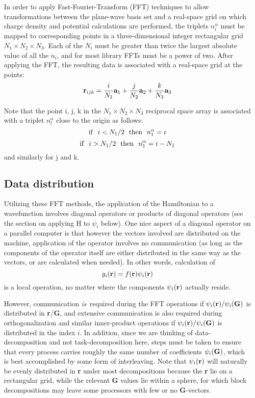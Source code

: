 In order to apply Fast-Fourier-Transform (FFT) techniques to allow
transformations between the plane-wave basis set and a real-space grid on
which charge density and potential calculations are performed,
the triplets $n^{\alpha}_i$ must be mapped to corresponding points in
a three-dimensional integer rectangular grid $N_1 \times N_2 \times N_3$.
Each of the $N_i$ must be greater than twice the largest absolute value
of all the $n_i$, and for most library FFTs must be a power of two. After
applying the FFT, the resulting data is associated with a real-space grid
at the points:
\begin{equation}
{\bf r}_{ijk} = {i \over N_1} {\bf a}_1 + {j \over N_2} {\bf a}_2 +
		{k \over N_3} {\bf a}_3
\end{equation}

Note that the point i, j, k in the $N_1 \times N_2 \times N_3$ reciprocal
space array is associated with a triplet $n^{\alpha}_l$ close to the
origin as follows:
\begin{equation}
{\rm if\ \ } i < N_1/2 {\rm\ \  then\ \ } n^{\alpha}_1 = i
\end{equation}
\begin{equation}
{\rm if\ \ } i > N_1/2 {\rm\ \  then\ \ } n^{\alpha}_1 = i - N_1
\end{equation}
and similarly for j and k.


\subsection{Data distribution}
Utilizing these FFT methods, the application of the Hamiltonian to
a wavefunction involves diagonal operators or products of diagonal
operators (see the section on applying H to $\psi_i$ below). One
nice aspect of a diagonal operator on a parallel computer is that
however the vectors involved are distributed on the machine, application
of the operator involves no communication (as long as the components
of the operator itself are either distributed in the same way as the
vectors, or are calculated when needed). In other words, calculation of
\begin{equation}
	g_i ({\bf r}) = f({\bf r}) \psi_i({\bf r})
\end{equation}
is a local operation, no matter where the components $\psi_i({\bf r})$
actually reside.

However, communication {\it is}\ required during the FFT operations
if $\psi_i({\bf r})/\psi_i({\bf G})$ is distributed in {\bf r}/{\bf G},
and extensive communication
is also required during orthogonalization and similar inner-product
operations if $\psi_i({\bf r})/\psi_i({\bf G})$ is distributed in the
index $i$. In addition, since we are thinking of data-decomposition and not
task-decomposition here, steps must be taken to ensure that every
process carries roughly the same number of coefficients $\psi_i({\bf G})$,
which is best accomplished by some form of interleaving. Note that
$\psi_i({\bf r})$ will naturally be evenly distributed in {\bf r} under most
decompositions because the {\bf r} lie on a rectangular grid, while
the relevant {\bf G} values lie within a sphere, for which block
decompositions may leave some processors with few or no {\bf G}-vectors.

